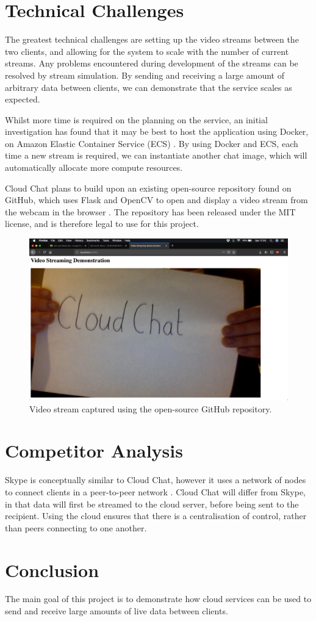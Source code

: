 \documentclass[conference]{IEEEtran}
\begin{document}
\section{Technical Challenges}
The greatest technical challenges are setting up the video streams between the two clients, and allowing for the system to scale with the number of current streams. Any problems encountered during development of the streams can be resolved by stream simulation. By sending and receiving a large amount of arbitrary data between clients, we can demonstrate that the service scales as expected.
\par
Whilst more time is required on the planning on the service, an initial investigation has found that it may be best to host the application using Docker, on Amazon Elastic Container Service (ECS) \cite{antonopoulos2010cloud}. By using Docker and ECS, each time a new stream is required, we can instantiate another chat image, which will automatically allocate more compute resources.
\par
Cloud Chat plans to build upon an existing open-source repository found on GitHub, which uses Flask and OpenCV to open and display a video stream from the webcam in the browser \cite{miguelgrinberg}. The repository has been released under the MIT license, and is therefore legal to use for this project. 
\begin{figure}[htbp]
\begin{center}
\includegraphics[width=0.6\linewidth]{screen.png}
\caption{Video stream captured using the open-source GitHub repository\cite{miguelgrinberg}.}
\label{default}
\end{center}
\end{figure}
\vspace{-0.5cm}
\section{Competitor Analysis}
Skype is conceptually similar to Cloud Chat, however it uses a network of nodes to connect clients in a peer-to-peer network \cite{baset2004analysis}. Cloud Chat will differ from Skype, in that data will first be streamed to the cloud server, before being sent to the recipient. Using the cloud ensures that there is a centralisation of control, rather than peers connecting to one another. 
\section{Conclusion}
The main goal of this project is to demonstrate how cloud services can be used to send and receive large amounts of live data between clients.



\end{document}
